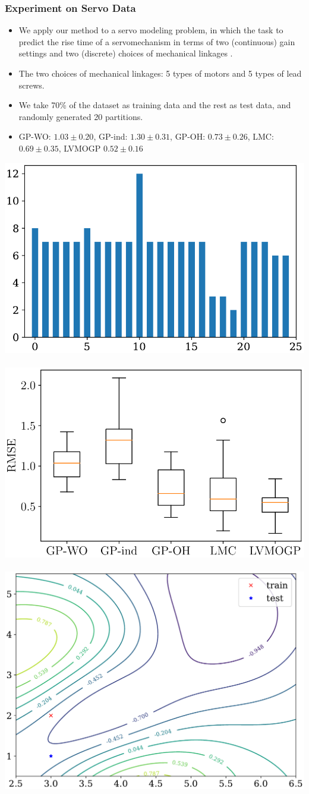 \documentclass[aspectratio=169]{beamer}
\begin{document}
       \begin{frame}
    \frametitle{Experiment on Servo Data}
    \begin{itemize}
    \item We apply our method to a servo modeling problem, in which the task to predict the rise time of a servomechanism in terms of two (continuous) gain settings and two (discrete) choices of mechanical linkages \citep{Quinlan1992}.
    \item The two choices of mechanical linkages: 5 types of motors and 5 types of lead screws.
    \item We take 70\% of the dataset as training data and the rest as test data, and randomly generated 20 partitions.
    \item GP-WO: $1.03\pm0.20$, GP-ind: $1.30\pm0.31$, GP-OH: $0.73\pm0.26$, LMC:$0.69\pm0.35$, LVMOGP $0.52\pm0.16$
  \end{itemize}
      \begin{center}
        \includegraphics[width=.32\linewidth]{servo_data}~
        \includegraphics[width=.32\linewidth]{servo_results}~
        \includegraphics[width=.29\linewidth]{servo_levelset}
     \end{center}
  \end{frame}
\end{document}

